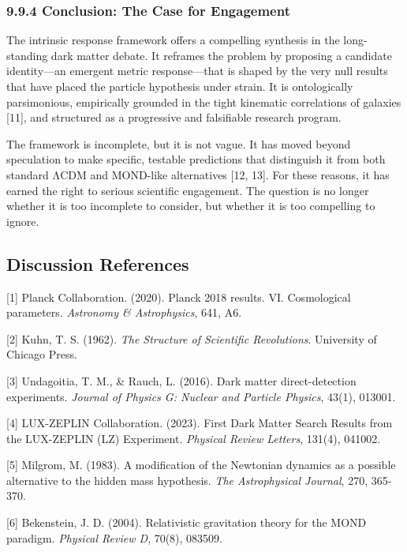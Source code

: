 \subsubsection{9.9.4 Conclusion: The Case for Engagement}\label{conclusion-the-case-for-engagement}

The intrinsic response framework offers a compelling synthesis in the long-standing dark matter debate. It reframes the problem by proposing a candidate identity---an emergent metric response---that is shaped by the very null results that have placed the particle hypothesis under strain. It is ontologically parsimonious, empirically grounded in the tight kinematic correlations of galaxies {[}11{]}, and structured as a progressive and falsifiable research program.

The framework is incomplete, but it is not vague. It has moved beyond speculation to make specific, testable predictions that distinguish it from both standard ΛCDM and MOND-like alternatives {[}12, 13{]}. For these reasons, it has earned the right to serious scientific engagement. The question is no longer whether it is too incomplete to consider, but whether it is too compelling to ignore.

\subsection{Discussion References}\label{discussion-references}

{[}1{]} Planck Collaboration. (2020). Planck 2018 results. VI. Cosmological parameters. \emph{Astronomy \& Astrophysics}, 641, A6.

{[}2{]} Kuhn, T. S. (1962). \emph{The Structure of Scientific Revolutions}. University of Chicago Press.

{[}3{]} Undagoitia, T. M., \& Rauch, L. (2016). Dark matter direct-detection experiments. \emph{Journal of Physics G: Nuclear and Particle Physics}, 43(1), 013001.

{[}4{]} LUX-ZEPLIN Collaboration. (2023). First Dark Matter Search Results from the LUX-ZEPLIN (LZ) Experiment. \emph{Physical Review Letters}, 131(4), 041002.

{[}5{]} Milgrom, M. (1983). A modification of the Newtonian dynamics as a possible alternative to the hidden mass hypothesis. \emph{The Astrophysical Journal}, 270, 365-370.

{[}6{]} Bekenstein, J. D. (2004). Relativistic gravitation theory for the MOND paradigm. \emph{Physical Review D}, 70(8), 083509.

